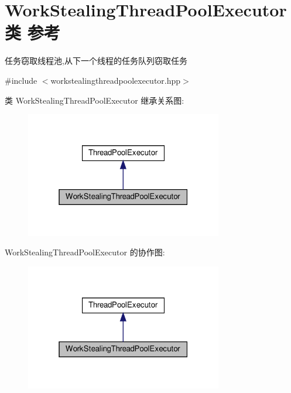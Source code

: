 \hypertarget{classWorkStealingThreadPoolExecutor}{}\section{Work\+Stealing\+Thread\+Pool\+Executor类 参考}
\label{classWorkStealingThreadPoolExecutor}


任务窃取线程池,从下一个线程的任务队列窃取任务  




{\ttfamily \#include $<$workstealingthreadpoolexecutor.\+hpp$>$}



类 Work\+Stealing\+Thread\+Pool\+Executor 继承关系图\+:\nopagebreak
\begin{figure}[H]
\begin{center}
\leavevmode
\includegraphics[width=244pt]{classWorkStealingThreadPoolExecutor__inherit__graph}
\end{center}
\end{figure}


Work\+Stealing\+Thread\+Pool\+Executor 的协作图\+:\nopagebreak
\begin{figure}[H]
\begin{center}
\leavevmode
\includegraphics[width=244pt]{classWorkStealingThreadPoolExecutor__coll__graph}
\end{center}
\end{figure}
